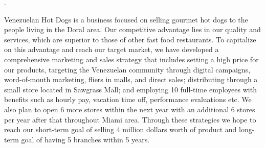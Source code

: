 .

Venezuelan Hot Dogs is a business focused on selling gourmet hot dogs to the people living in the Doral area. Our competitive advantage lies in our quality and services, which are superior to those of other fast food restaurants. To capitalize on this advantage and reach our target market, we have developed a comprehensive marketing and sales strategy that includes setting a high price for our products, targeting the Venezuelan community through digital campaigns, word-of-mouth marketing, fliers in malls, and direct sales; distributing through a small store located in Sawgrass Mall; and employing 10 full-time employees with benefits such as hourly pay, vacation time off, performance evaluations etc. We also plan to open 6 more stores within the next year with an additional 6 stores per year after that throughout Miami area. Through these strategies we hope to reach our short-term goal of selling 4 million dollars worth of product and long-term goal of having 5 branches within 5 years.